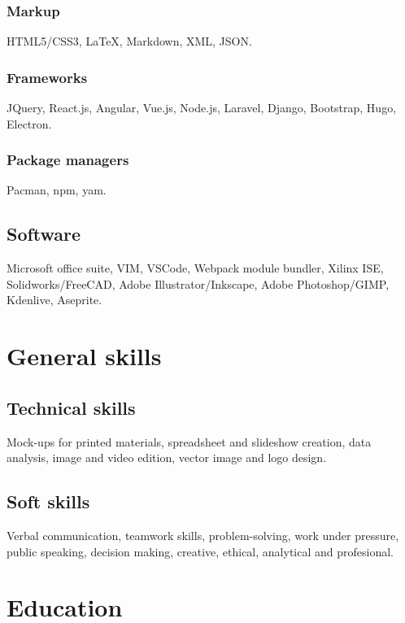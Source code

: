 \documentclass{article}
\begin{document}
    \subsubsection{Markup}

    HTML5/CSS3, {\LaTeX}, Markdown, XML, JSON.

    \subsubsection{Frameworks}

    JQuery, React.js, Angular, Vue.js, Node.js, Laravel, Django, Bootstrap, Hugo, Electron.

    \subsubsection{Package managers}

    Pacman, npm, yam.

    \subsection{Software}

    Microsoft office suite, VIM, VSCode, Webpack module bundler, Xilinx ISE, Solidworks/FreeCAD, Adobe Illustrator/Inkscape, Adobe Photoshop/GIMP, Kdenlive, Aseprite.


  \section{General skills}

  \subsection{Technical skills}
  Mock-ups for printed materials, spreadsheet and slideshow creation, data analysis, image and video edition, vector image and logo design.

  \subsection{Soft skills}
  Verbal communication, teamwork skills, problem-solving, work under pressure, public speaking, decision making, creative, ethical, analytical and profesional.


  \section{Education}
\end{document}
